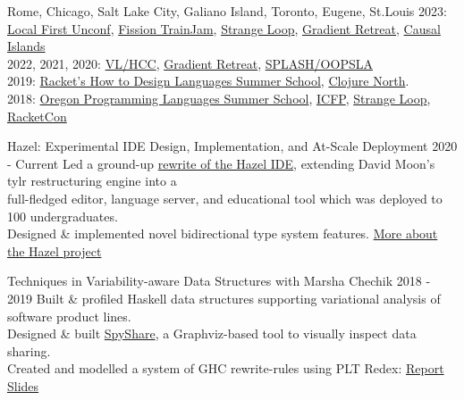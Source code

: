 \documentclass[10pt,a4paper]{article}
\begin{document}
    {Rome, Chicago, Salt Lake City, Galiano Island, Toronto, Eugene, St.Louis}    
    {2023:
    \href{https://lu.ma/localfirstswunconf-stlouis}{Local First Unconf},
    \href{https://talk.fission.codes/t/trainjam-2023/4789}{Fission TrainJam},
    \href{https://www.thestrangeloop.com/schedule.html}{Strange Loop},
    \href{https://www.gradientretreat.com/}{Gradient Retreat}, 
    \href{https://www.causalislands.com/}{Causal Islands} \\
    2022, 2021, 2020:
    \href{https://conf.researchr.org/home/vlhcc-2022}{VL/HCC},
    \href{https://www.gradientretreat.com/}{Gradient Retreat},
    \href{https://2021.splashcon.org/track/splash-2021-oopsla}{SPLASH/OOPSLA} \\
    2019:
    \href{https://school.racket-lang.org/2019/plan/}{Racket's How to Design Languages Summer School},
    \href{https://clojurenorth.com/}{Clojure North}. \\ 
    2018:
    \href{https://www.cs.uoregon.edu/research/summerschool/summer18/}{Oregon Programming Languages Summer School},
    \href{https://conf.researchr.org/home/icfp-2018}{ICFP},
    \href{https://www.thestrangeloop.com/2018/sessions.html}{Strange Loop},
    \href{https://con.racket-lang.org/2018/}{RacketCon}}
    

  \headedsubsection
    {Hazel: Experimental IDE Design, Implementation, and At-Scale Deployment}
    {2020 - Current}
    {Led a ground-up \href{https://hazel.org/build/haz3l-tests/}{rewrite of the Hazel IDE}, extending David Moon's tylr restructuring engine into a \\ full-fledged editor, language server, and educational tool which was deployed to 100 undergraduates.\\ Designed \& implemented novel bidirectional type system features. \href{https://hazel.org/}{More about the Hazel project}}

  \headedsubsection
    {Techniques in Variability-aware Data Structures with Marsha Chechik}
    {2018 - 2019}
    {Built \& profiled Haskell data structures supporting variational analysis of software product lines. \\
    Designed \& built \href{https://github.com/disconcision/spyshare}{SpyShare}, a Graphviz-based tool to visually inspect data sharing. \\
    Created and modelled a system of GHC rewrite-rules using PLT Redex:    \href{https://github.com/disconcision/vardatalab/blob/master/CSC495_TECHNIQUES_IN_VARIABILITY_AWARE_DATA_STRUCTURES.pdf}{Report} \sbull \href{https://github.com/disconcision/vardatalab/blob/master/CSC495_variational_data_structures_slides.pdf}{Slides}}
    
\end{document}

